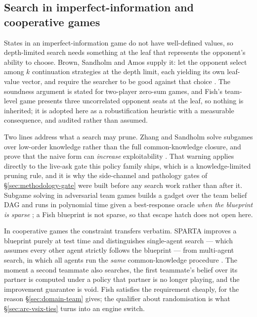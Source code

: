 \subsection{Search in imperfect-information and cooperative games}
\label{sec:related-search}

States in an imperfect-information game do not have well-defined values, so depth-limited search
needs something at the leaf that represents the opponent's ability to choose. Brown, Sandholm and
Amos supply it: let the opponent select among $k$ continuation strategies at the depth limit, each
yielding its own leaf-value vector, and require the searcher to be good against that choice
\cite{brown2018depthlimited}. The soundness argument is stated for two-player zero-sum games, and
Fish's team-level game presents three uncorrelated opponent seats at the leaf, so nothing is
inherited; it is adopted here as a robustification heuristic with a measurable consequence, and
audited rather than assumed.

Two lines address what a search may prune. Zhang and Sandholm solve subgames over low-order
knowledge rather than the full common-knowledge closure, and prove that the naive form can
\emph{increase} exploitability \cite{zhang2021subgamesolvingwithoutck}. That warning applies directly
to the live-ask gate this policy family ships, which is a knowledge-limited pruning rule, and it is
why the side-channel and pathology gates of \S\ref{sec:methodology-gate} were built before any
search work rather than after it. Subgame solving in adversarial team games builds a gadget over the
team belief DAG and runs in polynomial time given a best-response oracle \emph{when the blueprint is
sparse} \cite{zhang2022teamsubgame}; a Fish blueprint is not sparse, so that escape hatch does not
open here.

In cooperative games the constraint transfers verbatim. SPARTA improves a blueprint purely at test
time and distinguishes single-agent search --- which assumes every other agent strictly follows the
blueprint --- from multi-agent search, in which all agents run the \emph{same} common-knowledge
procedure \cite{lerer2020sparta}. The moment a second teammate also searches, the first teammate's
belief over its partner is computed under a policy that partner is no longer playing, and the
improvement guarantee is void. Fish satisfies the requirement cheaply, for the reason
\S\ref{sec:domain-team} gives; the qualifier about randomisation is what
\S\ref{sec:arc-vsix-ties} turns into an engine switch.

